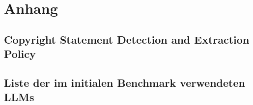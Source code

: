 \chapter{Anhang}\label{ch:anhang}



\section{Copyright Statement Detection and Extraction Policy}\label{sec:anhang-copyright-statement-detection-and-extraction-policy}



\section{Liste der im initialen Benchmark verwendeten LLMs}\label{sec:ahang-initial-benchmark-llm-liste}

